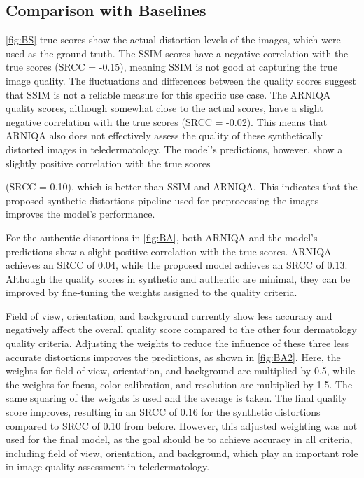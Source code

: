 \clearpage
\subsection{Comparison with Baselines}
\label{sub:5}
\autoref{fig:BS} true scores show the actual distortion levels of the images, which were used as the ground truth. The SSIM scores have a negative correlation with the true scores (SRCC = -0.15), meaning SSIM is not good at capturing the true image quality. The fluctuations and differences between the quality scores suggest that SSIM is not a reliable measure for this specific use case. The ARNIQA quality scores, although somewhat close to the actual scores, have a slight negative correlation with the true scores (SRCC = -0.02). This means that ARNIQA also does not effectively assess the quality of these synthetically distorted images in teledermatology. The model’s predictions, however, show a slightly positive correlation with the true scores \par \noindent (SRCC = 0.10), which is better than SSIM and ARNIQA. This indicates that the proposed synthetic distortions pipeline used for preprocessing the images improves the model’s performance. \par
\vspace{\baselineskip}
\noindent
For the authentic distortions in \autoref{fig:BA}, both ARNIQA and the model’s predictions show a slight positive correlation with the true scores. ARNIQA achieves an SRCC of 0.04, while the proposed model achieves an SRCC of 0.13.  Although the quality scores in synthetic and authentic are minimal, they can be improved by fine-tuning the weights assigned to the quality criteria. \par
\vspace{\baselineskip}
\noindent
Field of view, orientation, and background currently show less accuracy and negatively affect the overall quality score compared to the other four dermatology quality criteria. Adjusting the weights to reduce the influence of these three less accurate distortions improves the predictions, as shown in \autoref{fig:BA2}. Here, the weights for field of view, orientation, and background are multiplied by 0.5, while the weights for focus, color calibration, and resolution are multiplied by 1.5. The same squaring of the weights is used and the average is taken. The final quality score improves, resulting in an SRCC of 0.16 for the synthetic distortions compared to SRCC of 0.10 from before. However, this adjusted weighting was not used for the final model, as the goal should be to achieve accuracy in all criteria, including field of view, orientation, and background, which play an important role in image quality assessment in teledermatology.\par

